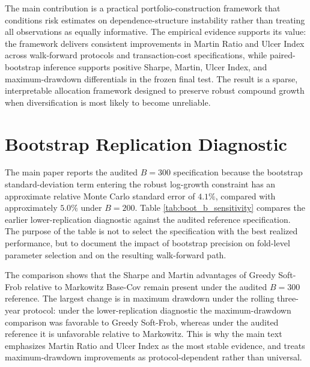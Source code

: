 \documentclass[11pt]{article}
\begin{document}
The main contribution is a practical portfolio-construction framework that conditions risk estimates on dependence-structure instability rather than treating all observations as equally informative. The empirical evidence supports its value: the framework delivers consistent improvements in Martin Ratio and Ulcer Index across walk-forward protocols and transaction-cost specifications, while paired-bootstrap inference supports positive Sharpe, Martin, Ulcer Index, and maximum-drawdown differentials in the frozen final test. The result is a sparse, interpretable allocation framework designed to preserve robust compound growth when diversification is most likely to become unreliable.

\newpage


\appendix
\section{Bootstrap Replication Diagnostic}
\label{app:bootstrap_reps}

The main paper reports the audited $B=300$ specification because the bootstrap standard-deviation term entering the robust log-growth constraint has an approximate relative Monte Carlo standard error of $4.1\%$, compared with approximately $5.0\%$ under $B=200$. Table \ref{tab:boot_b_sensitivity} compares the earlier lower-replication diagnostic against the audited reference specification. The purpose of the table is not to select the specification with the best realized performance, but to document the impact of bootstrap precision on fold-level parameter selection and on the resulting walk-forward path.

The comparison shows that the Sharpe and Martin advantages of Greedy Soft-Frob relative to Markowitz Base-Cov remain present under the audited $B=300$ reference. The largest change is in maximum drawdown under the rolling three-year protocol: under the lower-replication diagnostic the maximum-drawdown comparison was favorable to Greedy Soft-Frob, whereas under the audited reference it is unfavorable relative to Markowitz. This is why the main text emphasizes Martin Ratio and Ulcer Index as the most stable evidence, and treats maximum-drawdown improvements as protocol-dependent rather than universal.
\end{document}
